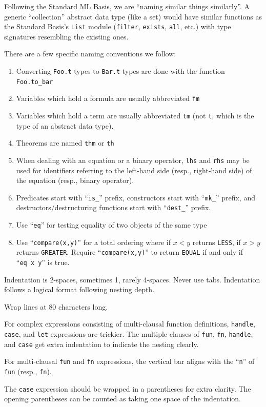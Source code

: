 \begin{node}
Following the Standard ML Basis, we are ``naming similar things similarly''.
A generic ``collection'' abstract data type (like a set) would have
similar functions as the Standard Basis's \texttt{List} module
(\texttt{filter}, \texttt{exists}, \texttt{all}, etc.) with type
signatures resembling the existing ones.
\end{node}

\begin{node}
There are a few specific naming conventions we follow:
\begin{enumerate}
\item Converting \texttt{Foo.t} types to \texttt{Bar.t} types are done
  with the function \texttt{Foo.to\_bar}
\item Variables which hold a formula are usually abbreviated \texttt{fm}
\item Variables which hold a term are usually abbreviated \texttt{tm}
  (not \texttt{t}, which is the type of an abstract data type).
\item Theorems are named \texttt{thm} or \texttt{th}
\item When dealing with an equation or a binary operator, \texttt{lhs} and \texttt{rhs} may
  be used for identifiers referring to the left-hand side (resp.,
  right-hand side) of the equation (resp., binary operator).
\item Predicates start with ``\texttt{is\_}'' prefix, constructors
  start with ``\texttt{mk\_}'' prefix, and destructors/destructuring
  functions start with ``\texttt{dest\_}'' prefix.
\item Use ``\texttt{eq}'' for testing equality of two objects of the
  same type
\item Use ``\texttt{compare(x,y)}'' for a total ordering where if
  $x<y$ returns \texttt{LESS}, if $x>y$ returns
  \texttt{GREATER}. Require ``\texttt{compare(x,y)}'' to return
  \texttt{EQUAL} if and only if ``\texttt{eq~x~y}'' is true.
\end{enumerate}
\end{node}

\begin{node}[Whitespace]
Indentation is 2-spaces, sometimes 1, rarely 4-spaces. Never use tabs.
Indentation follows a logical format following nesting depth.

Wrap lines at 80 characters long.

For complex expressions consisting of multi-clausal function
definitions, \texttt{handle}, \texttt{case}, and \texttt{let}
expressions are trickier. The multiple clauses of \texttt{fun},
\texttt{fn}, \texttt{handle}, and \texttt{case} get extra indentation
to indicate the nesting clearly.

For multi-clausal \texttt{fun} and \texttt{fn} expressions, the
vertical bar aligns with the ``\texttt{n}'' of \texttt{fun} (resp.,
\texttt{fn}). 

The \texttt{case} expression should be wrapped in a parentheses for
extra clarity. The opening parentheses can be counted as taking one
space of the indentation.
\end{node}

